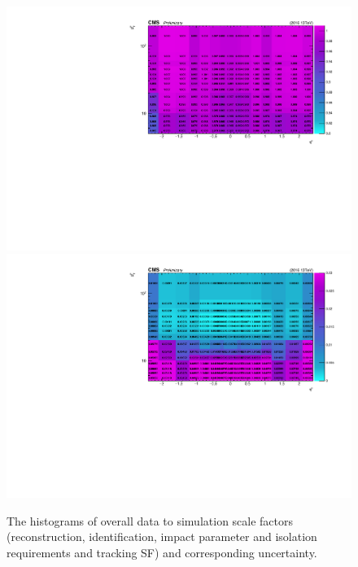 		\begin{figure}[!htbp]
		  \centering
		  \includegraphics[width=1.0\textwidth]{Fig/MuonIDSF/Histogram_SFs_HZZID_FINAL}\\
		  \includegraphics[width=1.0\textwidth]{Fig/MuonIDSF/Histogram_SFs_HZZID_ERROR}\\
		  \caption{The histograms of overall data to simulation scale factors (reconstruction, identification, impact parameter and isolation requirements and tracking SF) and corresponding uncertainty.\label{fig:MuonSFs}}
		\end{figure}
		
